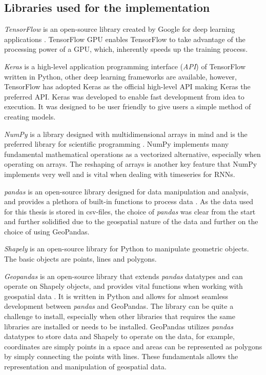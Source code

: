 \documentclass[../main.tex]{subfiles}
\begin{document}
\subsection{Libraries used for the implementation}

\textit{TensorFlow} is an open-source library created by Google for deep learning applications \cite{TF_2015}. TensorFlow GPU enables TensorFlow to take advantage of the processing power of a GPU, which, inherently speeds up the training process.

\textit{Keras} is a high-level application programming interface (\textit{API}) of TensorFlow written in Python, other deep learning frameworks are available, however, TensorFlow has adopted Keras as the official high-level API making Keras the preferred API. Keras was developed to enable fast development from idea to execution. It was designed to be user friendly to give users a simple method of creating models.

\textit{NumPy} is a library designed with multidimensional arrays in mind and is the preferred library for scientific programming \cite{numpy_2020}. NumPy implements many fundamental mathematical operations as a vectorized alternative, especially when operating on arrays. The reshaping of arrays is another key feature that NumPy implements very well and is vital when dealing with timeseries for RNNs.

\textit{pandas} is an open-source library designed for data manipulation and analysis, and provides a plethora of built-in functions to process data \cite{Pandas_2022}. As the data used for this thesis is stored in csv-files, the choice of \textit{pandas} was clear from the start and further solidified due to the geospatial nature of the data and further on the choice of using GeoPandas.

\textit{Shapely} is an open-source library for Python to manipulate geometric objects. The basic objects are points, lines and polygons.

\textit{Geopandas} is an open-source library that extends \textit{pandas} datatypes and can operate on Shapely objects, and provides vital functions when working with geospatial data \cite{Geopandas_2020}. It is written in Python and allows for almost seamless development between \textit{pandas} and GeoPandas. The library can be quite a challenge to install, especially when other libraries that requires the same libraries are installed or needs to be installed. GeoPandas utilizes \textit{pandas} datatypes to store data and Shapely to operate on the data, for example, coordinates are simply points in a space and areas can be represented as polygons by simply connecting the points with lines. These fundamentals allows the representation and manipulation of geospatial data.
\end{document}
